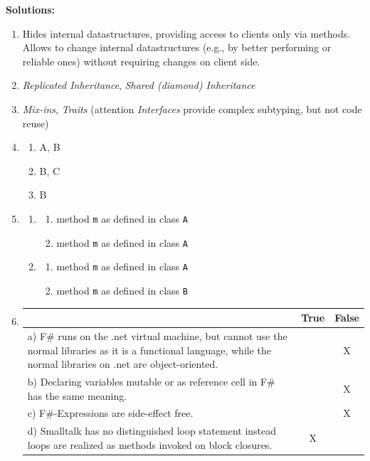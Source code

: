 \documentclass{article}
\newcommand{\solution}[1] {\textbf{Solutions:}\\ #1}
\begin{document}
\solution{
\begin{enumerate}
\item Hides internal datastructures, providing access to clients only
  via methods. Allows to change internal datastructures (e.g., by
  better performing or reliable ones) without requiring changes on
  client side.
\item \emph{Replicated Inheritance}, \emph{Shared (diamond)
    Inheritance}
\item \emph{Mix-ins}, \emph{Traits} (attention \emph{Interfaces}
  provide complex subtyping, but not code reuse)
\item 
    \begin{enumerate}
      \item A, B
      \item B, C
      \item B
    \end{enumerate}
\item 
    \begin{enumerate}
    \item 
    \begin{enumerate}
    \item method \lstinline!m! as defined in class \lstinline!A!
    \item method \lstinline!m! as defined in class \lstinline!A!
  \end{enumerate}
    \item 
    \begin{enumerate}
    \item method \lstinline!m! as defined in class \lstinline!A!
    \item method \lstinline!m! as defined in class \lstinline!B!
    \end{enumerate}
    \end{enumerate}
\item
      \begin{tabular}{|p{6cm}|c|c|}\hline
      & True & False \\ \hline
      a) F\# runs on the \textsf{.net} virtual machine, but cannot use the
      normal libraries as it is a functional language, while the normal
      libraries on \textsf{.net} are object-oriented. & & X \\\hline
      b) Declaring variables mutable or as reference cell in F\# has
      the same meaning. & & X \\\hline
      c) F\#-Expressions are side-effect free. & & X \\\hline
      d) Smalltalk has no distinguished loop statement instead loops
      are realized as methods invoked on block closures.  & X & \\\hline
   \end{tabular}\\

\end{enumerate}
}
\end{document}
